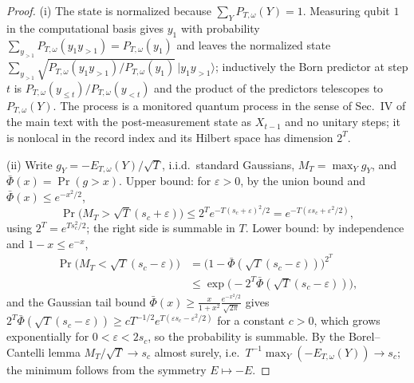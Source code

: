 \documentclass[aps,prx,reprint,superscriptaddress,nobibnotes,longbibliography]{revtex4-2}
\begin{document}
\begin{proof}
(i) The state is normalized because $\sum_YP_{T,\omega}(Y)=1$.  Measuring
qubit $1$ in the computational basis gives $y_1$ with probability
$\sum_{y_{>1}}P_{T,\omega}(y_1y_{>1})=P_{T,\omega}(y_1)$ and leaves the
normalized state
$\sum_{y_{>1}}\sqrt{P_{T,\omega}(y_1y_{>1})/P_{T,\omega}(y_1)}
\,|y_1y_{>1}\rangle$; inductively the Born predictor at step $t$ is
$P_{T,\omega}(y_{\le t})/P_{T,\omega}(y_{<t})$ and the product of the
predictors telescopes to $P_{T,\omega}(Y)$.  The process is a monitored
quantum process in the sense of Sec.~IV of the main text with the
post-measurement state as $X_{t-1}$ and no unitary steps; it is nonlocal
in the record index and its Hilbert space has dimension $2^T$.

(ii) Write $g_Y=-E_{T,\omega}(Y)/\sqrt T$, i.i.d.\ standard Gaussians,
$M_T=\max_Yg_Y$, and $\bar\Phi(x)=\Pr(g>x)$.  Upper bound: for
$\varepsilon>0$, by the union bound and $\bar\Phi(x)\le e^{-x^2/2}$,
\begin{equation*}
 \Pr\bigl(M_T>\sqrt T(s_c+\varepsilon)\bigr)
 \le2^Te^{-T(s_c+\varepsilon)^2/2}
 =e^{-T(\varepsilon s_c+\varepsilon^2/2)},
\end{equation*}
using $2^T=e^{Ts_c^2/2}$; the right side is summable in $T$.  Lower
bound: by independence and $1-x\le e^{-x}$,
\begin{align*}
 \Pr\bigl(M_T<\sqrt T(s_c-\varepsilon)\bigr)
 &=\bigl(1-\bar\Phi(\sqrt T(s_c-\varepsilon))\bigr)^{2^T}\\
 &\le\exp\bigl(-2^T\bar\Phi(\sqrt T(s_c-\varepsilon))\bigr),
\end{align*}
and the Gaussian tail bound
$\bar\Phi(x)\ge\frac{x}{1+x^2}\frac{e^{-x^2/2}}{\sqrt{2\pi}}$ gives
$2^T\bar\Phi(\sqrt T(s_c-\varepsilon))
\ge cT^{-1/2}e^{T(\varepsilon s_c-\varepsilon^2/2)}$ for a constant
$c>0$, which grows exponentially for $0<\varepsilon<2s_c$, so the
probability is summable.  By the Borel--Cantelli lemma
$M_T/\sqrt T\to s_c$ almost surely, i.e.\
$T^{-1}\max_Y(-E_{T,\omega}(Y))\to s_c$; the minimum follows from the
symmetry $E\mapsto-E$.


\end{proof}
\end{document}
